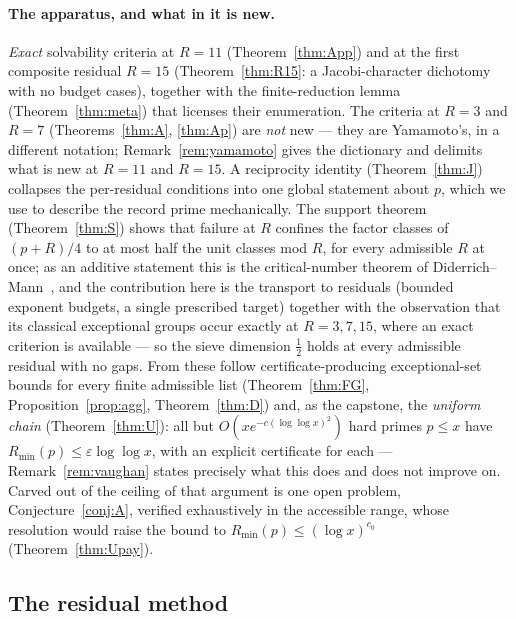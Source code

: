 \documentclass[11pt]{article}
\theoremstyle{plain}
\theoremstyle{remark}
\theoremstyle{plain}
\numberwithin{equation}{section}
\begin{document}
\paragraph*{The apparatus, and what in it is new.} \emph{Exact}
solvability criteria at $R = 11$ (Theorem~\ref{thm:App}) and at the
first composite residual $R = 15$ (Theorem~\ref{thm:R15}: a
Jacobi-character dichotomy with no budget cases), together with the
finite-reduction lemma (Theorem~\ref{thm:meta}) that licenses their
enumeration. The criteria at $R = 3$ and $R = 7$
(Theorems~\ref{thm:A}, \ref{thm:Ap}) are \emph{not} new --- they are
Yamamoto's, in a different notation; Remark~\ref{rem:yamamoto} gives
the dictionary and delimits what is new at $R = 11$ and $R = 15$.
A reciprocity identity (Theorem~\ref{thm:J}) collapses the
per-residual conditions into one global statement about $p$, which we
use to describe the record prime mechanically. The support theorem
(Theorem~\ref{thm:S}) shows that failure at $R$ confines the factor
classes of $(p+R)/4$ to at most half the unit classes mod $R$, for
every admissible $R$ at once; as an additive statement this is the
critical-number theorem of Diderrich--Mann~\cite{DiderrichMann}, and
the contribution here is the transport to residuals (bounded exponent
budgets, a single prescribed target) together with the observation
that its classical exceptional groups occur exactly at $R = 3, 7, 15$,
where an exact criterion is available --- so the sieve dimension
$\tfrac12$ holds at every admissible residual with no gaps. From these
follow certificate-producing exceptional-set bounds for every finite
admissible list (Theorem~\ref{thm:FG}, Proposition~\ref{prop:agg},
Theorem~\ref{thm:D}) and, as the capstone, the \emph{uniform chain}
(Theorem~\ref{thm:U}): all but $O(x e^{-c(\log\log x)^2})$ hard primes
$p \le x$ have $R_{\min}(p) \le \varepsilon\log\log x$, with an
explicit certificate for each --- Remark~\ref{rem:vaughan} states
precisely what this does and does not improve on. Carved out of the
ceiling of that argument is one open problem, Conjecture~\ref{conj:A},
verified exhaustively in the accessible range, whose resolution would
raise the bound to $R_{\min}(p) \le (\log x)^{c_0}$
(Theorem~\ref{thm:Upay}).

\subsection{The residual method}\label{sec:intro-method}
\end{document}
